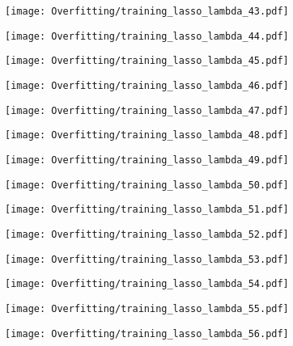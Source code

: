 \documentclass[xcolor=pdftex,dvipsnames,table]{beamer}
\begin{document}
\frame
{
	\begin{center}
		\texttt{[image: Overfitting/training\_lasso\_lambda\_43.pdf]}
	\end{center}
}
\frame
{
	\begin{center}
		\texttt{[image: Overfitting/training\_lasso\_lambda\_44.pdf]}
	\end{center}
}
\frame
{
	\begin{center}
		\texttt{[image: Overfitting/training\_lasso\_lambda\_45.pdf]}
	\end{center}
}
\frame
{
	\begin{center}
		\texttt{[image: Overfitting/training\_lasso\_lambda\_46.pdf]}
	\end{center}
}
\frame
{
	\begin{center}
		\texttt{[image: Overfitting/training\_lasso\_lambda\_47.pdf]}
	\end{center}
}
\frame
{
	\begin{center}
		\texttt{[image: Overfitting/training\_lasso\_lambda\_48.pdf]}
	\end{center}
}
\frame
{
	\begin{center}
		\texttt{[image: Overfitting/training\_lasso\_lambda\_49.pdf]}
	\end{center}
}
\frame
{
	\begin{center}
		\texttt{[image: Overfitting/training\_lasso\_lambda\_50.pdf]}
	\end{center}
}
\frame
{
	\begin{center}
		\texttt{[image: Overfitting/training\_lasso\_lambda\_51.pdf]}
	\end{center}
}
\frame
{
	\begin{center}
		\texttt{[image: Overfitting/training\_lasso\_lambda\_52.pdf]}
	\end{center}
}
\frame
{
	\begin{center}
		\texttt{[image: Overfitting/training\_lasso\_lambda\_53.pdf]}
	\end{center}
}
\frame
{
	\begin{center}
		\texttt{[image: Overfitting/training\_lasso\_lambda\_54.pdf]}
	\end{center}
}
\frame
{
	\begin{center}
		\texttt{[image: Overfitting/training\_lasso\_lambda\_55.pdf]}
	\end{center}
}
\frame
{
	\begin{center}
		\texttt{[image: Overfitting/training\_lasso\_lambda\_56.pdf]}
	\end{center}
}
\end{document}

